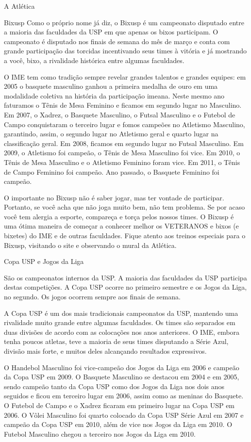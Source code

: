 \begin{secao}{A Atlética}
\begin{subsecao}{Bixusp}
Como o próprio nome já diz, o Bixusp é um campeonato disputado entre a maioria
das faculdades da USP em que apenas os bixos participam. O campeonato é
disputado nos finais de semana do mês de março e conta com grande participação
das torcidas incentivando seus times à vitória e já mostrando a você, bixo, a
rivalidade histórica entre algumas faculdades.

O IME tem como tradição sempre revelar grandes talentos e grandes equipes: em
2005 o basquete masculino ganhou a primeira medalha de ouro em uma modalidade
coletiva na história da participação imeana. Neste mesmo ano faturamos o Tênis
de Mesa Feminino e ficamos em segundo lugar no Masculino. Em 2007, o Xadrez, o 
Basquete Masculino, o Futsal Masculino e o Futebol de Campo conquistaram o 
terceiro lugar e fomos campeões no Atletismo Masculino, garantindo, assim, o 
segundo lugar no Atletismo geral e quarto lugar na classificação geral. Em 2008,
ficamos em segundo lugar no Futsal Masculino. Em 2009, o Atletismo foi campeão, 
o Tênis de Mesa Masculino foi vice. Em 2010, o Tênis de Mesa Masculino e o 
Atletismo Feminino foram vice. Em 2011, o Tênis de Campo Feminino foi campeão. 
Ano passado, o Basquete Feminino foi campeão.

O importante no Bixusp não é saber jogar, mas ter vontade de participar.
Portanto, se você acha que não joga muito bem, não tem problema. Se por acaso
você tem alergia a esporte, compareça e torça pelos nossos times. O Bixusp é uma
ótima maneira de começar a conhecer melhor os VETERANOS e bixos (e bixetes) do
IME e de outras faculdades. Fique atento aos treinos especiais para o Bixusp, 
visitando o site e observando o mural da Atlética.

\end{subsecao}
\begin{subsecao}{Copa USP e Jogos da Liga}

São os campeonatos internos da USP. A maioria das faculdades da USP participa
destas competições. A Copa USP ocorre no primeiro semestre e os Jogos da Liga,
no segundo. Os jogos ocorrem sempre aos finais de semana.

A Copa USP é um dos mais tradicionais campeonatos da USP, mantendo uma
rivalidade muito grande entre algumas faculdades. Os times são separados em
duas divisões de acordo com as colocações nos anos anteriores. O IME, embora
tenha poucos atletas, teve a maioria de seus times disputando a Série Azul,
divisão mais forte, e muitos deles alcançando resultados expressivos.

O Handebol Masculino foi vice-campeão dos Jogos da Liga em 2006 e campeão da
Copa USP em 2009. O Basquete Masculino se destacou em 2004 e em 2005, sendo
campeão tanto da Copa USP como dos Jogos da Liga nos dois anos seguidos e ficou
em terceiro lugar em 2006, assim como as meninas do Basquete. O Futebol de
Campo e o Xadrez ficaram em primeiro lugar na Copa USP em 2006. O Vôlei
Masculino foi quarto colocado da Copa USP Série Azul em 2007 e campeão da Copa
USP em 2010, além de vice nos Jogos da Liga em 2010. O Futebol Masculino chegou
a terceiro nos Jogos da Liga em 2010.


\end{subsecao}
\end{secao}
